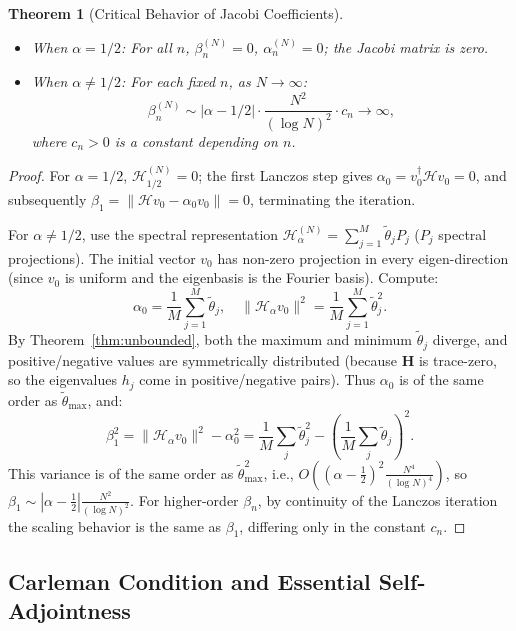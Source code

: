 \documentclass[12pt,a4paper]{amsart}
\theoremstyle{plain}
\newtheorem{theorem}{Theorem}[section]
\theoremstyle{definition}
\theoremstyle{remark}
\begin{document}
\begin{theorem}[Critical Behavior of Jacobi Coefficients]\label{thm:jacobi}
\begin{itemize}
\item When $\alpha = 1/2$: For all $n$, $\beta_n^{(N)} = 0$, $\alpha_n^{(N)} = 0$; the Jacobi matrix is zero.
\item When $\alpha \neq 1/2$: For each fixed $n$, as $N \to \infty$:
\[
\beta_n^{(N)} \sim |\alpha-1/2| \cdot \frac{N^2}{(\log N)^2} \cdot c_n \to \infty,
\]
where $c_n>0$ is a constant depending on $n$.
\end{itemize}
\end{theorem}

\begin{proof}
For $\alpha=1/2$, $\mathcal{H}_{1/2}^{(N)}=0$; the first Lanczos step gives $\alpha_0=v_0^\dagger\mathcal{H}v_0=0$, and subsequently $\beta_1=\|\mathcal{H}v_0-\alpha_0 v_0\|=0$, terminating the iteration.

For $\alpha\neq 1/2$, use the spectral representation $\mathcal{H}_\alpha^{(N)}=\sum_{j=1}^M \tilde{\theta}_j P_j$ ($P_j$ spectral projections). The initial vector $v_0$ has non-zero projection in every eigen-direction (since $v_0$ is uniform and the eigenbasis is the Fourier basis). Compute:
\[
\alpha_0 = \frac{1}{M}\sum_{j=1}^M \tilde{\theta}_j,\quad \|\mathcal{H}_\alpha v_0\|^2 = \frac{1}{M}\sum_{j=1}^M \tilde{\theta}_j^2.
\]
By Theorem~\ref{thm:unbounded}, both the maximum and minimum $\tilde{\theta}_j$ diverge, and positive/negative values are symmetrically distributed (because $\mathbf{H}$ is trace-zero, so the eigenvalues $h_j$ come in positive/negative pairs). Thus $\alpha_0$ is of the same order as $\tilde{\theta}_{\max}$, and:
\[
\beta_1^2 = \|\mathcal{H}_\alpha v_0\|^2 - \alpha_0^2 = \frac{1}{M}\sum_j\tilde{\theta}_j^2 - \left(\frac{1}{M}\sum_j\tilde{\theta}_j\right)^2.
\]
This variance is of the same order as $\tilde{\theta}_{\max}^2$, i.e., $O((\alpha-\frac12)^2\frac{N^4}{(\log N)^4})$, so $\beta_1\sim|\alpha-\frac12|\frac{N^2}{(\log N)^2}$. For higher-order $\beta_n$, by continuity of the Lanczos iteration the scaling behavior is the same as $\beta_1$, differing only in the constant $c_n$.
\end{proof}

\subsection{Carleman Condition and Essential Self-Adjointness}
\end{document}
